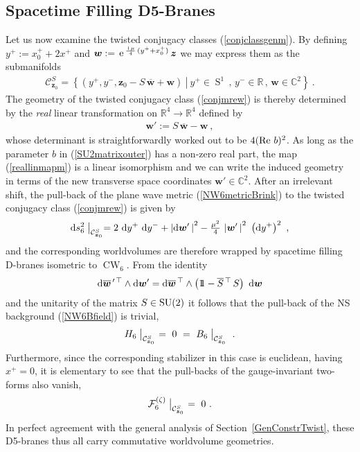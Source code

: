 \documentclass[11pt,a4paper]{article}
\DeclareMathOperator{\Sphere}{S}
\DeclareMathOperator{\CW}{CW}
\let\S\Sphere
\newcommand{\ii}{{\rm i}}
\newcommand{\mbf}[1]{{\boldsymbol {#1} }}
\def\ii{{\,{\rm i}\,}}
\def\dd{{\rm d}}
\def\mz{{\mbf z}}
\def\mw{{\mbf w}}
\newcommand{\complex}{{\mathbb C}} %
\newcommand{\real}{{\mathbb R}} %
\newcommand{\id}{{1\!\!1}} %
\def\e{{\,\rm e}\,}
\newcommand{\beq}{\begin{eqnarray}}
\newcommand{\eeq}{\end{eqnarray}}
\begin{document}
\subsection{Spacetime Filling D5-Branes\label{LorD5}}

Let us now examine the twisted conjugacy classes
(\ref{conjclassgenm}). By defining $y^+:=x_0^++2x^+$ and
$\mw:=\e^{\frac{\ii\mu}4\,(y^++x_0^+)}\,\mz$ we may express them as the
submanifolds
\beq
\mathcal{C}_{\mz_0}^S=\left.\left\{(y^+,y^-,\mz_0-S\,\overline{\mw}+\mw)~
\right|~y^+\in\S^1\,,\,y^-\in\real\,,\,\mw\in\complex^2\right\} \ .
\label{conjmrew}\eeq
The geometry of the twisted conjugacy class (\ref{conjmrew}) is
thereby determined by the {\it real} linear transformation on
$\real^4\to\real^4$ defined by
\beq
\mw':=S\,\overline{\mw}-\mw \ ,
\label{reallinmapm}\eeq
whose determinant is straightforwardly worked out to be $4({\rm
  Re}~b)^2$. As long as the parameter $b$ in (\ref{SU2matrixouter}) has
a non-zero real part, the map (\ref{reallinmapm}) is a linear
isomorphism and we can write the induced geometry in terms of the new
transverse space coordinates $\mw'\in\complex^2$. After an irrelevant
shift, the pull-back of the plane wave metric (\ref{NW6metricBrink})
to the twisted conjugacy class (\ref{conjmrew}) is given by
\beq
\dd s_6^2\bigm|_{\mathcal{C}_{\mz_0}^S}=2~\dd y^+~\dd y^-+\left|\dd
\mw'\,\right|^2-\mbox{$\frac{\mu^2}4$}\,\left|\mw'\,
\right|^2~\left(\dd y^+\right)^2 \ ,
\label{D5metricpull}\eeq
and the corresponding worldvolumes are therefore wrapped by spacetime
filling D-branes isometric to $\CW_6$. From the identity
\beq
\dd\overline{\mw}{}^{\,\prime\,\top}\wedge\dd\mw'=\dd\overline{\mw}{}^{\,\top}
\wedge\left(\id-\overline{S}{}^{\,\top}\,S\right)~\dd\mw
\label{dwidentity}\eeq
and the unitarity of the matrix $S\in{\rm SU}(2)$ it follows that the
pull-back of the NS background (\ref{NW6Bfield}) is trivial,
\beq
H_6\bigm|_{\mathcal{C}_{\mz_0}^S}~=~0~=~
B_6\bigm|_{\mathcal{C}_{\mz_0}^S} \ .
\label{D5Bpull}\eeq
Furthermore, since the corresponding stabilizer in this case is
euclidean, having $x^+=0$, it is elementary to see that the pull-backs
of the gauge-invariant two-forms also vanish,
\beq
\mathcal{F}^{(\zeta)}_6\bigm|_{\mathcal{C}_{\mz_0}^S}~=~0 \ .
\label{D5F6pull}\eeq
In perfect agreement with the general analysis of
Section~\ref{GenConstrTwist}, these D5-branes thus all carry
commutative worldvolume geometries.
\end{document}
